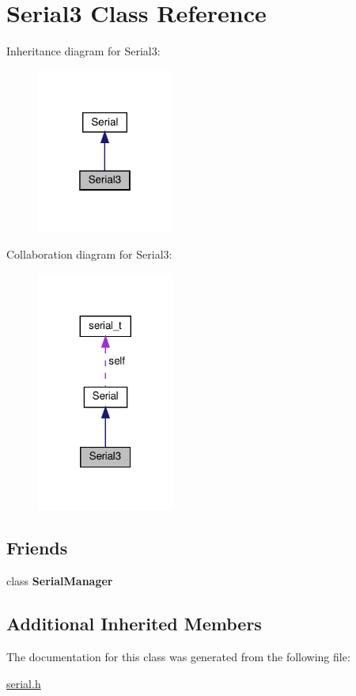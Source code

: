 \hypertarget{classSerial3}{}\section{Serial3 Class Reference}
\label{classSerial3}


Inheritance diagram for Serial3\+:\nopagebreak
\begin{figure}[H]
\begin{center}
\leavevmode
\includegraphics[width=127pt]{classSerial3__inherit__graph}
\end{center}
\end{figure}


Collaboration diagram for Serial3\+:\nopagebreak
\begin{figure}[H]
\begin{center}
\leavevmode
\includegraphics[width=128pt]{classSerial3__coll__graph}
\end{center}
\end{figure}
\subsection*{Friends}
\begin{DoxyCompactItemize}
\item 
\mbox{\label{classSerial3_ae711712f6bc003a5d1156a409a19941b}} 
class {\bfseries Serial\+Manager}
\end{DoxyCompactItemize}
\subsection*{Additional Inherited Members}


The documentation for this class was generated from the following file\+:\begin{DoxyCompactItemize}
\item 
\hyperlink{serial_8h}{serial.\+h}\end{DoxyCompactItemize}
